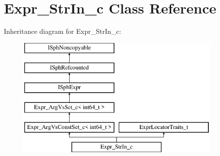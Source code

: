 \hypertarget{classExpr__StrIn__c}{\section{Expr\-\_\-\-Str\-In\-\_\-c Class Reference}
\label{classExpr__StrIn__c}
}
Inheritance diagram for Expr\-\_\-\-Str\-In\-\_\-c\-:\begin{figure}[H]
\begin{center}
\leavevmode
\includegraphics[height=6.000000cm]{classExpr__StrIn__c}
\end{center}
\end{figure}

